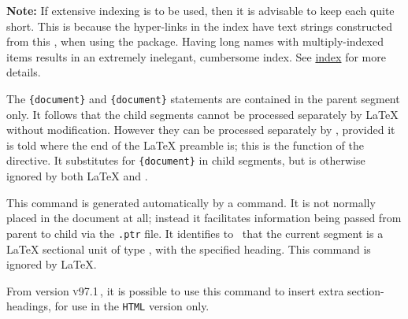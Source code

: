 \begin{changebar}
\begin{htmllist}
\begin{htmllist}
\end{htmllist}
\begin{changebar}
%
\html{\\}%
\textbf{Note: } If extensive indexing is to be used, then it is advisable
to keep each  quite short. This is because the hyper-links
in the index have text strings constructed from this ,
when using the  package. Having long names with
multiply-indexed items results in an extremely inelegant, cumbersome index.
See \hyperref{the section on indexing}{Section~}{}{index} for more details.%
\end{changebar}


%
%
\item [ \Lc{startdocument}\label{startdoc}]
%
The \verb|{document}| and  \verb|{document}|
statements are contained in the parent segment only.  
It follows that the child segments cannot be processed
separately by \LaTeX{} without modification.  However they can be
processed separately by \latextohtml, provided it is told
where the end of the \LaTeX{} preamble is;  this is
the function of the  directive.  It 
substitutes for \verb|{document}| in child segments, 
but is otherwise ignored by both \LaTeX{} and \latextohtml.

%
\item [ \Lc{htmlhead\char123}\Meta{sec-type}%
 \texttt{\char125\char123}\Meta{heading}\texttt{\char125}\label{htmlhead}] 
%
This command is generated automatically by 
a  command. 
It is not normally placed in the document at all; instead it facilitates 
information being passed from parent to child 
via the \texttt{.ptr} file.\html{\\}  
It identifies to \latextohtml\ that the current segment 
is a \LaTeX{} sectional unit of type , with the specified heading.\html{\\}
This command is ignored by \LaTeX. %
\begin{changebar}
From version \textsc{v97.1}\,, it is possible to use this command to insert extra section-headings,
for use in the \texttt{HTML} version only.%
\end{changebar}


\end{htmllist}
\end{changebar}
